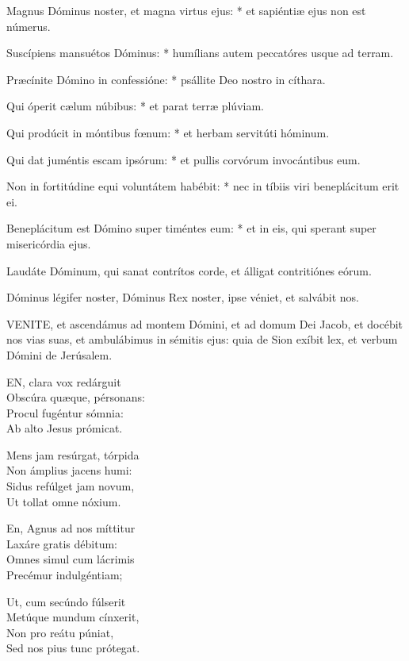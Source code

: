 Magnus Dóminus noster, et magna virtus ejus: * et sapiéntiæ ejus non est númerus.

Suscípiens mansuétos Dóminus: * humílians autem peccatóres usque ad terram.

Præcínite Dómino in confessióne: * psállite Deo nostro in cíthara.

Qui óperit cælum núbibus: * et parat terræ plúviam.

Qui prodúcit in móntibus fœnum: * et herbam servitúti hóminum.

Qui dat juméntis escam ipsórum: * et pullis corvórum invocántibus eum.

Non in fortitúdine equi voluntátem habébit: * nec in tíbiis viri beneplácitum erit ei.

Beneplácitum est Dómino super timéntes eum: * et in eis, qui sperant super misericórdia ejus.

 Laudáte Dóminum, qui sanat contrítos corde, et álligat contritiónes eórum.

  Dóminus légifer noster, Dóminus Rex noster, ipse véniet, et salvábit nos.



\lettrine[lines=2]{V}{ENITE}, et ascendámus ad montem Dómini, et ad domum Dei Jacob, et docébit nos vias suas, et ambulábimus in sémitis ejus: quia de Sion exíbit lex, et verbum Dómini de Jerúsalem.


\lettrine[lines=2]{E}{N}, clara vox redárguit\\
Obscúra quæque, pérsonans:\\
Procul fugéntur sómnia:\\
Ab alto Jesus prómicat.

Mens jam resúrgat, tórpida\\
Non ámplius jacens humi:\\
Sidus refúlget jam novum,\\
Ut tollat omne nóxium.

En, Agnus ad nos míttitur\\
Laxáre gratis débitum:\\
Omnes simul cum lácrimis\\
Precémur indulgéntiam;

Ut, cum secúndo fúlserit\\
Metúque mundum cínxerit,\\
Non pro reátu púniat,\\
Sed nos pius tunc prótegat.

